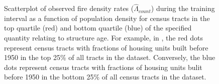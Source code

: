 \documentclass{svjour3}
\begin{document}
\begin{figure}[!htb]
\begin{center}
      \end{center}
      \caption{Scatterplot of observed fire density rates ($\hat\Lambda_{count}$) during the training interval as a function of population density for census tracts in the top quartile (red) and bottom quartile (blue) of the specified quantity relating to structure age. For example, in \protect{}, the red dots represent census tracts with fractions of housing units built before 1950 in the top 25\% of all tracts in the dataset. Conversely, the blue dots represent census tracts with fractions of housing units bulit before 1950 in the bottom 25\% of all census tracts in the dataset.}
     \label{fig:building age}
  \end{figure}
 
 
   \begin{figure}[!htb]
       \begin{center}
          \\ %
\end{center}
\end{figure}
\end{document}
